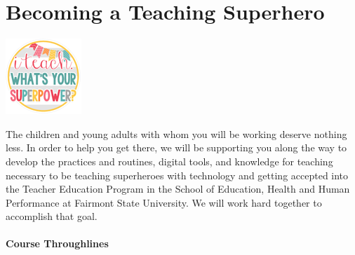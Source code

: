 \documentclass{tufte-handout}
\begin{document}
\part{Becoming a Teaching Superhero}

\begin{marginfigure}%
	\begin{center}
		\includegraphics[width=0.75\linewidth]{teach-superpower.png}
		\label{fig:teach-superpower}
	\end{center}
\end{marginfigure}


 The children and young adults with whom you will be working deserve nothing less. In order to help you get there, we will be supporting you along the way to develop the practices and routines, digital tools, and knowledge for teaching necessary to be teaching superheroes with technology and getting accepted into the Teacher Education Program in the School of Education, Health and Human Performance at Fairmont State University. We will work hard together to accomplish that goal.

\subsection{Course Throughlines}
\end{document}
